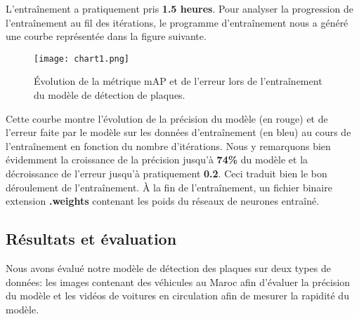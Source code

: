     L’entraînement a pratiquement pris \textbf{1.5 heures}. Pour analyser la progression de l'entraînement au fil des itérations, le programme d'entraînement nous a généré une courbe représentée dans la figure suivante.
    \begin{figure}[H]
        \centering
        \texttt{[image: chart1.png]}
        \caption{Évolution de la métrique mAP et de l'erreur lors de l'entraînement du modèle de détection de plaques.}
    \end{figure}
    Cette courbe montre l’évolution de la précision du modèle (en rouge) et de l'erreur faite par le modèle sur les données d'entraînement (en bleu) au cours de l’entraînement en fonction du nombre d'itérations. Nous y remarquons bien évidemment la croissance de la précision jusqu'à \textbf{74\%} du modèle et la décroissance de l'erreur jusqu'à pratiquement \textbf{0.2}. Ceci traduit bien le bon déroulement de l'entraînement. À la fin de l'entraînement, un fichier binaire extension \textbf{.weights} contenant les poids du réseaux de neurones entraîné.

    \subsection{Résultats et évaluation}
    Nous avons évalué notre modèle de détection des plaques sur deux types de données: les images contenant des véhicules au Maroc afin d'évaluer la précision du modèle et les vidéos de voitures en circulation afin de mesurer la rapidité du modèle. 
    
